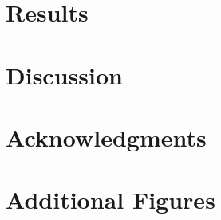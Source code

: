 \documentclass[aip,cha,reprint,superscriptaddress,floatfix,nofootinbib,twoside]{revtex4-1}
\begin{document}
\section{Results}
\label{sec:results}


\section{Discussion}
\label{sec:conclusion}




\appendix

\section{Acknowledgments}
\label{sec:acknowledgements}


\section{Additional Figures}
\label{sec:figures}

\end{document}

